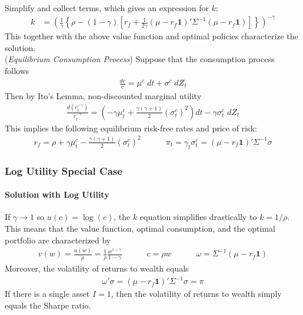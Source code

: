 \documentclass[12pt]{article}
\theoremstyle{plain}
\theoremstyle{definition}
\theoremstyle{remark}
\newcommand{\ra}{\rightarrow}
\begin{document}
Simplify and collect terms, which gives an expression for $k$:
\begin{align*}
  k
  &=
  \left(
  \frac{1}{\gamma}
  \left\{
  \rho
  -
  (1-\gamma)
  \left[
  r_f
  +
  \frac{1}{2\gamma}
  (\mu - r_f\mathbf{1})'
  \Sigma^{-1}
  (\mu - r_f\mathbf{1})
  \right]
  \right\}
  \right)^{-\gamma}
\end{align*}
This together with the above value function and optimal policies
characterize the solution.
\\
(\emph{Equilibrium Consumption Process})
Suppose that the consumption process follows
\begin{align*}
  \frac{dc}{c} = \mu^c\;dt + \sigma^c\;dZ_t
\end{align*}
Then by Ito's Lemma, non-discounted marginal utility
\begin{align*}
  \frac{d(c_t^{-\gamma})}{c_t^{-\gamma}}
  =
  \left(
  -\gamma \mu_t^c
  + \frac{\gamma(\gamma+1)}{2}
  (\sigma_t^c)^2
  \right)
  dt
  -
  \gamma\sigma_t^c\;dZ_t
\end{align*}
This implies the following equilibrium risk-free rates and price of
risk:
\begin{align*}
  r_f =
  \rho
  +\gamma \mu_t^c
  -
  \frac{\gamma(\gamma+1)}{2}
  (\sigma_t^c)^2
  \quad\qquad
  \pi_t
  =
  \gamma_t\sigma_t^c
  =
  (\mu-r_f\mathbf{1})'\Sigma^{-1}\sigma
\end{align*}


\subsubsection{Log Utility Special Case}

\paragraph{Solution with Log Utility}
If $\gamma\ra 1$ so $u(c)=\log(c)$, the $k$ equation simplifies
drastically to $k=1/\rho$.
This means that the value function, optimal consumption, and the optimal
portfolio are characterized by
\begin{align*}
  v(w)
  = \frac{u(w)}{\rho}
  = \frac{1}{\rho}
  \frac{w^{1-\gamma}}{1-\gamma}
  \quad\qquad
  c=\rho w
  \quad\qquad
  \omega
  =
  \Sigma^{-1}(\mu-r_f\mathbf{1})
\end{align*}
Moreover, the volatility of returns to wealth equals
\begin{align*}
  \omega'\sigma
  =
  (\mu - r_f\mathbf{1})'\Sigma^{-1}
  \sigma
  =
  \pi
\end{align*}
If there is a single asset $I=1$, then the volatility of returns to
wealth simply equals the Sharpe ratio.
\end{document}
